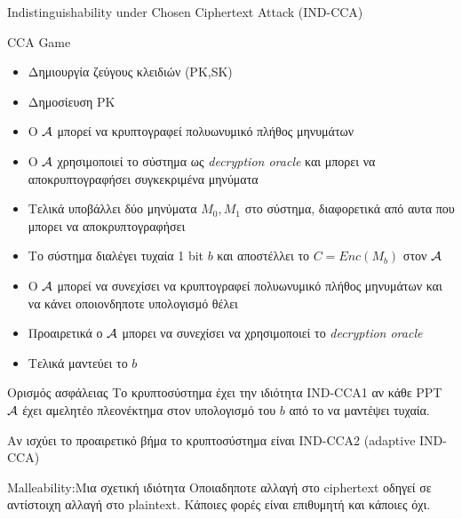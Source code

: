 \documentclass{beamer}
\begin{document}
\begin{frame}[allowframebreaks]{Indistinguishability under Chosen Ciphertext Attack (IND-CCA)}

CCA Game

\begin{itemize}
\item Δημιουργία ζεύγους κλειδιών (PK,SK)
\item Δημοσίευση PK
\item Ο $\mathcal{A}$ μπορεί να κρυπτογραφεί πολυωνυμικό πλήθος μηνυμάτων
\item Ο $\mathcal{A}$ χρησιμοποιεί το σύστημα ως \textit{decryption oracle} και μπορει να αποκρυπτογραφήσει συγκεκριμένα μηνύματα
\item Τελικά υποβάλλει δύο μηνύματα $ M_0, M_1 $  στο σύστημα, διαφορετικά από αυτα που μπορει να αποκρυπτογραφήσει
\item Το σύστημα διαλέγει τυχαία 1 bit $b$ και αποστέλλει το $C=Enc(M_b)$ στον $\mathcal{A}$
\item Ο $\mathcal{A}$ μπορεί να συνεχίσει να κρυπτογραφεί πολυωνυμικό πλήθος μηνυμάτων και να κάνει οποιονδηποτε υπολογισμό θέλει
\item Προαιρετικά ο $\mathcal{A}$ μπορει να συνεχίσει να χρησιμοποιεί το \textit{decryption oracle} 
\item Τελικά μαντεύει το $b$
\end{itemize}


\begin{block}{Ορισμός ασφάλειας}
Το κρυπτοσύστημα έχει την ιδιότητα IND-CCA1 αν κάθε PPT $\mathcal{A}$ έχει αμελητέο πλεονέκτημα στον υπολογισμό του $b$ από το να μαντέψει τυχαία.

Αν ισχύει το προαιρετικό βήμα το κρυπτοσύστημα είναι IND-CCA2 (adaptive IND-CCA)
\end{block}

\begin{block}{Malleability:Μια σχετική ιδιότητα}
Οποιαδηποτε αλλαγή στο ciphertext οδηγεί σε αντίστοιχη αλλαγή στο plaintext. Κάποιες φορές είναι επιθυμητή και κάποιες όχι.
\end{block}

\end{frame}
\end{document}
